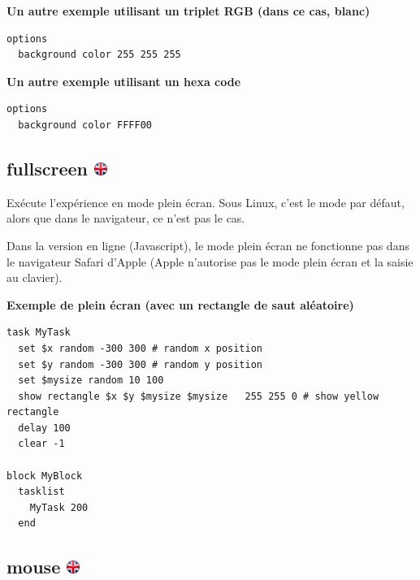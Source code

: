 \documentclass[
]{book}
\begin{document}
\textbf{Un autre exemple utilisant un triplet RGB (dans ce cas, blanc)}

\begin{verbatim}
options
  background color 255 255 255
\end{verbatim}

\textbf{Un autre exemple utilisant un hexa code}

\begin{verbatim}
options
  background color FFFF00
\end{verbatim}

\hypertarget{fullscreen}{%
\subsection[fullscreen ]{\texorpdfstring{fullscreen
\href{https://www.psytoolkit.org/doc3.2.0/syntax.html\#options-fullscreen}{\protect\includegraphics{img/ukflag.png}}}{fullscreen }}\label{fullscreen}}

Exécute l'expérience en mode plein écran. Sous Linux, c'est le mode par
défaut, alors que dans le navigateur, ce n'est pas le cas.

Dans la version en ligne (Javascript), le mode plein écran ne fonctionne
pas dans le navigateur Safari d'Apple (Apple n'autorise pas le mode
plein écran et la saisie au clavier).

\textbf{Exemple de plein écran (avec un rectangle de saut aléatoire)}

\begin{verbatim}
task MyTask
  set $x random -300 300 # random x position
  set $y random -300 300 # random y position
  set $mysize random 10 100
  show rectangle $x $y $mysize $mysize   255 255 0 # show yellow rectangle
  delay 100
  clear -1

block MyBlock
  tasklist
    MyTask 200
  end
\end{verbatim}

\hypertarget{mouse}{%
\subsection[mouse ]{\texorpdfstring{mouse
\href{https://www.psytoolkit.org/doc3.2.0/syntax.html\#options-mouse}{\protect\includegraphics{img/ukflag.png}}}{mouse }}\label{mouse}}
\end{document}
